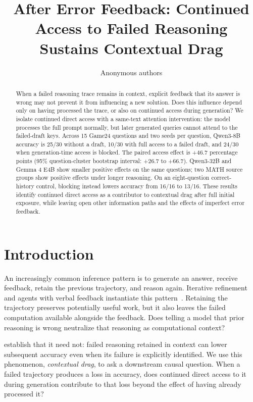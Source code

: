 \documentclass{article}
\title{After Error Feedback: Continued Access to Failed Reasoning Sustains Contextual Drag}
\author{Anonymous authors}
\begin{document}
\maketitle

\begin{abstract}
When a failed reasoning trace remains in context, explicit feedback that its answer is wrong may not prevent it from influencing a new solution. Does this influence depend only on having processed the trace, or also on continued access during generation? We isolate continued direct access with a same-text attention intervention: the model processes the full prompt normally, but later generated queries cannot attend to the failed-draft keys. Across 15 Game24 questions and two seeds per question, Qwen3-8B accuracy is 25/30 without a draft, 10/30 with full access to a failed draft, and 24/30 when generation-time access is blocked. The paired access effect is +46.7 percentage points (95\% question-cluster bootstrap interval: +26.7 to +66.7). Qwen3-32B and Gemma 4 E4B show smaller positive effects on the same questions; two MATH source groups show positive effects under longer reasoning. On an eight-question correct-history control, blocking instead lowers accuracy from 16/16 to 13/16. These results identify continued direct access as a contributor to contextual drag after full initial exposure, while leaving open other information paths and the effects of imperfect error feedback.
\end{abstract}

\section{Introduction}

An increasingly common inference pattern is to generate an answer, receive feedback, retain the previous trajectory, and reason again. Iterative refinement and agents with verbal feedback instantiate this pattern~\citep{madaan2023selfrefine,shinn2023reflexion}. Retaining the trajectory preserves potentially useful work, but it also leaves the failed computation available alongside the feedback. Does telling a model that prior reasoning is wrong neutralize that reasoning as computational context?

\citet{cheng2026contextualdrag} establish that it need not: failed reasoning retained in context can lower subsequent accuracy even when its failure is explicitly identified. We use this phenomenon, \emph{contextual drag}, to ask a downstream causal question. When a failed trajectory produces a loss in accuracy, does continued direct access to it during generation contribute to that loss beyond the effect of having already processed it?
\end{document}
